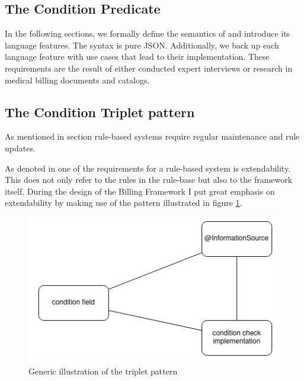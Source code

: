\subsection{The Condition Predicate}\label{subsec:the-condition-predicate}

In the following sections, we formally define the semantics of \RL and introduce its language features.
The syntax is pure JSON.
Additionally, we back up each language feature with use cases that lead to their implementation.
These requirements are the result of either conducted expert interviews or research in medical billing documents and catalogs.


\subsection{The Condition Triplet pattern}\label{subsec:the-condition-triplet-pattern}
As mentioned in section \addref rule-based systems require regular maintenance and rule updates.

As denoted in \addref one of the requirements for a rule-based system is extendability. \addcite
This does not only refer to the rules in the rule-base but also to the framework itself.
During the design of the Billing Framework I put great emphasis on extendability
by making use of the pattern illustrated in figure \ref{fig:condition-triplet-pattern}.

\begin{figure}
    \centering
    \includegraphics[width=0.75\linewidth]{./figures/condition-triplet-pattern}
    \caption{Generic illustration of the triplet pattern}
    \label{fig:condition-triplet-pattern}
\end{figure}

